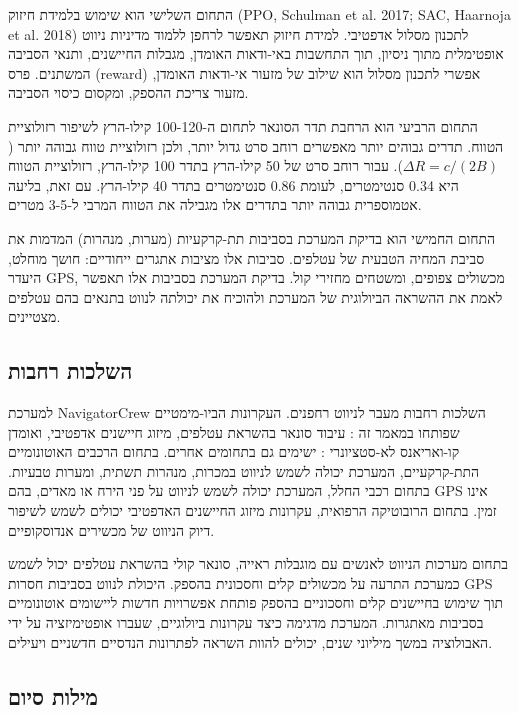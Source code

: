 התחום השלישי הוא שימוש בלמידת חיזוק (PPO, Schulman et al. 2017; SAC, Haarnoja et al. 2018) לתכנון מסלול אדפטיבי. למידת חיזוק תאפשר לרחפן ללמוד מדיניות ניווט אופטימלית מתוך ניסיון, תוך התחשבות באי-ודאות האומדן, מגבלות החיישנים, ותנאי הסביבה המשתנים. פרס (reward) אפשרי לתכנון מסלול הוא שילוב של מזעור אי-ודאות האומדן, מזעור צריכת ההספק, ומקסום כיסוי הסביבה.

התחום הרביעי הוא הרחבת תדר הסונאר לתחום ה-100-120 קילו-הרץ לשיפור רזולוציית הטווח. תדרים גבוהים יותר מאפשרים רוחב סרט גדול יותר, ולכן רזולוציית טווח גבוהה יותר ($\Delta R = c / (2B)$). עבור רוחב סרט של 50 קילו-הרץ בתדר 100 קילו-הרץ, רזולוציית הטווח היא 0.34 סנטימטרים, לעומת 0.86 סנטימטרים בתדר 40 קילו-הרץ. עם זאת, בליעה אטמוספרית גבוהה יותר בתדרים אלו מגבילה את הטווח המרבי ל-3-5 מטרים.

התחום החמישי הוא בדיקת המערכת בסביבות תת-קרקעיות (מערות, מנהרות) המדמות את סביבת המחיה הטבעית של עטלפים. סביבות אלו מציבות אתגרים ייחודיים: חושך מוחלט, היעדר GPS, מכשולים צפופים, ומשטחים מחזירי קול. בדיקת המערכת בסביבות אלו תאפשר לאמת את ההשראה הביולוגית של המערכת ולהוכיח את יכולתה לנווט בתנאים בהם עטלפים מצטיינים.

\subsection{השלכות רחבות}
\label{sec:ch09_implications}

למערכת NavigatorCrew השלכות רחבות מעבר לניווט רחפנים. העקרונות הביו-מימטיים שפותחו במאמר זה : עיבוד סונאר בהשראת עטלפים, מיזוג חיישנים אדפטיבי, ואומדן קו-ואריאנס לא-סטציונרי : ישימים גם בתחומים אחרים. בתחום הרכבים האוטונומיים התת-קרקעיים, המערכת יכולה לשמש לניווט במכרות, מנהרות תשתית, ומערות טבעיות. בתחום רכבי החלל, המערכת יכולה לשמש לניווט על פני הירח או מאדים, בהם GPS אינו זמין. בתחום הרובוטיקה הרפואית, עקרונות מיזוג החיישנים האדפטיבי יכולים לשמש לשיפור דיוק הניווט של מכשירים אנדוסקופיים.

בתחום מערכות הניווט לאנשים עם מוגבלות ראייה, סונאר קולי בהשראת עטלפים יכול לשמש כמערכת התרעה על מכשולים קלים וחסכונית בהספק. היכולת לנווט בסביבות חסרות GPS תוך שימוש בחיישנים קלים וחסכוניים בהספק פותחת אפשרויות חדשות ליישומים אוטונומיים בסביבות מאתגרות. המערכת מדגימה כיצד עקרונות ביולוגיים, שעברו אופטימיזציה על ידי האבולוציה במשך מיליוני שנים, יכולים להוות השראה לפתרונות הנדסיים חדשניים ויעילים.

\subsection{מילות סיום}
\label{sec:ch09_final}

